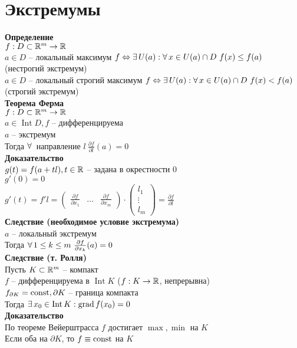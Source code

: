 \documentclass[12pt]{article}
\DeclareMathOperator{\Int}{Int}
\DeclareMathOperator{\grad}{grad}
\newcommand{\ppart}[2]{\frac{\partial #1}{\partial #2}}
\begin{document}
\section{Экстремумы}
\textbf{Определение}\\
$f: D\subset \mathbb{R}^m \rightarrow \mathbb{R}$\\
$a \in D$ -- локальный максимум $f \Leftrightarrow \exists\, U(a): \forall\, x \in U(a) \cap D\ f(x) \leq f(a)$ (нестрогий экстремум)\\
$a \in D$ -- локальный строгий максимум $f \Leftrightarrow \exists\, U(a): \forall\, x \in U(a) \cap D\ f(x) < f(a)$ (строгий экстремум)\\
\textbf{Теорема Ферма}\\
$f: D \subset \mathbb{R}^m \rightarrow \mathbb{R}$\\
$a \in \Int D, f$ -- дифференцируема\\
$a$ -- экстремум\\
Тогда $\forall\,$ направление $l\ \frac{\partial f}{\partial l} (a) = 0$\\
\textbf{Доказательство}\\
$g(t) = f(a+tl), t \in \mathbb{R}$ -- задана в окрестности 0\\
$g'(0) = 0$\\
$g'(t) = f'l = \begin{pmatrix}
    \ppart f{x_1} & \ldots & \ppart f{x_m}
\end{pmatrix}\cdot \begin{pmatrix}
    l_1\\\vdots\\l_m
\end{pmatrix} = \ppart{f}{l}$\\
\textbf{Следствие (необходимое условие экстремума)}\\
$a$ -- локальный экстремум\\
Тогда $\fall 1 \leq k \leq m\ \ppart{f}{x_k}(a) = 0$\\
\textbf{Следствие (т. Ролля)}\\
Пусть $K \subset \mathbb{R}^m$ -- компакт\\
$f$ -- дифференцируема в $\Int K$ ($f: K \rightarrow \mathbb{R}$, непрерывна)\\
$f_{\partial K} = \operatorname{const}, \partial K$ -- граница компакта\\
Тогда $\ex x_0 \in \Int K: \grad f(x_0) = 0$\\
\textbf{Доказательство}\\
По теореме Вейерштрасса $f$ достигает $\max, \min$ на $K$\\
Если оба на $\partial K$, то $f \equiv \operatorname{const}$ на $K$\\
\end{document}
